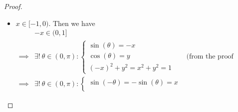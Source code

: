 \begin{proof}
\begin{itemize}
\begin{align*}
              \end{align*}
              Using similar arguments we can show that \(\cos\big([\frac{\pi}{2}, \pi)\big) \subseteq (-1, 0]\).
              Thus we have
              \begin{align*}
                   & \big(x \in (0, 1]\big) \land \big(y \in [0, 1)\big) \implies \exists\ \theta_1 \in (0, \frac{\pi}{2}] : \big(\sin(\theta_1) = x\big) \land \big(\cos(\theta_1) = y\big);    \\
                   & \big(x \in (0, 1]\big) \land \big(y \in (-1, 0]\big) \implies \exists\ \theta_2 \in [\frac{\pi}{2}, \pi) : \big(\sin(\theta_2) = x\big) \land \big(\cos(\theta_2) = y\big).
              \end{align*}
              But \(\cos\) is strictly decreasing on \((0, \pi)\) implies the choices of \(\theta_1\) and \(\theta_2\) are unique.
              And we conclude that
              \[
                  \forall x \in (0, 1], \exists!\ \theta \in (0, \pi) : \begin{cases}
                      \sin(\theta) = x \\
                      \cos(\theta) = y \\
                      x^2 + y^2 = 1
                  \end{cases}
              \]
        \item \(x \in [-1, 0)\).
              Then we have
              \begin{align*}
                           & -x \in (0, 1]                                                                     \\
                  \implies & \exists!\ \theta \in (0, \pi) : \begin{cases}
                                                                 \sin(\theta) = -x \\
                                                                 \cos(\theta) = y  \\
                                                                 (-x)^2 + y^2 = x^2 + y^2 = 1
                                                             \end{cases}  & \text{(from the proof above)}      \\
                  \implies & \exists!\ \theta \in (0, \pi) : \begin{cases}
                                                                 \sin(-\theta) = -\sin(\theta) = x \\

\end{cases}
\end{align*}
\end{itemize}
\end{proof}
